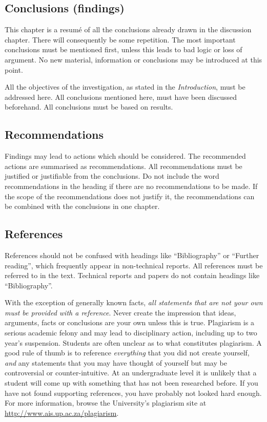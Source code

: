 \documentclass[a5paper, 10pt]{article}
\newcommand{\subsectionname}[1]{\emph{#1}}
\begin{document}
\subsection{Conclusions (findings)}
\label{sec:conclusions}
This chapter is a resum\'e of all the conclusions already drawn in the
discussion chapter.  There will consequently be some repetition.  The
most important conclusions must be mentioned first, unless this leads
to bad logic or loss of argument.  No new material, information or
conclusions may be introduced at this point.

All the objectives of the investigation, as stated in the
\subsectionname{Introduction}, must be addressed here.  All conclusions
mentioned here, must have been discussed beforehand.  All conclusions
must be based on results.

\subsection{Recommendations}
\label{sec:recommendations}

Findings may lead to actions which should be considered.  The
recommended actions are summarised as recommendations.  All
recommendations must be justified or justifiable from the conclusions.
Do not include the word recommendations in the heading if there are no
recommendations to be made.  If the scope of the recommendations does
not justify it, the recommendations can be combined with the
conclusions in one chapter.

\subsection{References}
\label{sec:references}
References should not be confused with headings like ``Bibliography''
or ``Further reading'', which frequently appear in non-technical
reports.  All references must be referred to in the text. Technical
reports and papers do not contain headings like ``Bibliography''.

With the exception of generally known facts, \emph{all statements that are
not your own must be provided with a reference}.  Never create the
impression that ideas, arguments, facts or conclusions are your own
unless this is true.  Plagiarism is a serious academic felony and may lead to disciplinary action, including up to two year's suspension.
Students are often unclear as to what constitutes plagiarism.  A good
rule of thumb is to reference \emph{everything} that you did not
create yourself, \emph{and} any statements that you may have thought
of yourself but may be controversial or counter-intuitive.  At an
undergraduate level it is unlikely that a student will come up with
something that has not been researched before.  If you have not found
supporting references, you have probably not looked hard enough.  For
more information, browse the University's plagiarism site at
\url{http://www.ais.up.ac.za/plagiarism}.
\end{document}
